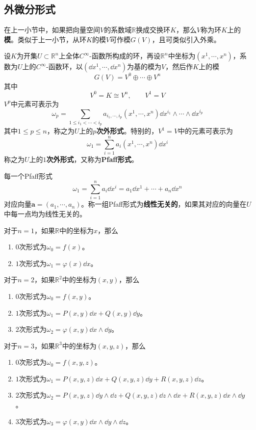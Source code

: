 \documentclass[lang = cn, scheme = chinese, thmcnt = section]{elegantbook}
\newcommand{\R}{\mathbb{R}}            %
\newcommand{\sub}{\subset}             %
\newcommand{\bs}{\boldsymbol}          %
\begin{document}
\subsection{外微分形式}

在上一小节中，如果把向量空间$V$的系数域$\R$换成交换环$K$，那么$V$称为环$K$上的\textbf{模}。类似于上一小节，从环$K$的模$V$可作模$G(V)$，且可类似引入外乘。

设$K$为开集$U\sub\R^n$上全体$C^\infty$-函数所构成的环，再设$\R^n$中坐标为$(x^1,\cdots,x^n)$，系数为$U$上的$C^\infty$-函数环，以$(\dd x^1,\cdots,\dd x^n)$为基的模为$V$，然后作$K$上的模%
$$
G(V)=V^0\oplus\cdots\oplus V^n
$$
其中%
$$
V^0=K\cong V^n,\qquad V^1=V
$$
$V^p$中元素可表示为%
$$
\omega_p=\sum_{1\le i_1<\cdots<i_p}a_{i_1,\cdots,i_p}(x^1,\cdots,x^n)\dd x^{i_1}\wedge\cdots\wedge\dd x^{i_p}
$$
其中$1\le p \le n$，称之为$U$上的\textbf{$p$次外形式}。特别的，$V^1=V$中的元素可表示为%
$$
\omega_1=\sum_{i=1}^{n}a_i(x^1,\cdots,x^n)\dd x^{i}
$$
称之为$U$上的\textbf{$1$次外形式}，又称为\textbf{Pfaff形式}。

每一个Pfaff形式
$$
\omega_1=\sum_{i=1}^{n}a_i\dd x^{i}
=a_1\dd x^{1}+\cdots+a_n\dd x^{n}
$$
对应向量$\bs{a}=(a_1,\cdots,a_n)$。称一组Pfaff形式为\textbf{线性无关的}，如果其对应的向量在$U$中每一点均为线性无关的。

\begin{example}
	对于$n=1$，如果$\R$中的坐标为$x$，那么
	\begin{enumerate}
		\item $0$次形式为$\omega_0=f(x)$。
		\item $1$次形式为$\omega_1=\varphi(x)\dd x$。
	\end{enumerate}
\end{example}

\begin{example}
	对于$n=2$，如果$\R^2$中的坐标为$(x,y)$，那么
	\begin{enumerate}
		\item $0$次形式为$\omega_0=f(x,y)$。
		\item $1$次形式为$\omega_1=P(x,y)\dd x+Q(x,y)\dd y$。
		\item $2$次形式为$\omega_2=\varphi(x,y)\dd x\wedge\dd y$。
	\end{enumerate}
\end{example}

\begin{example}
	对于$n=3$，如果$\R^3$中的坐标为$(x,y,z)$，那么
	\begin{enumerate}
		\item $0$次形式为$\omega_0=f(x,y,z)$。
		\item $1$次形式为$\omega_1=P(x,y,z)\dd x+Q(x,y,z)\dd y+R(x,y,z)\dd z$。
		\item $2$次形式为$\omega_2=P(x,y,z)\dd y\wedge \dd z+Q(x,y,z)\dd z\wedge \dd x+R(x,y,z)\dd x\wedge \dd y$。
		\item $3$次形式为$\omega_3=\varphi(x,y)\dd x\wedge\dd y\wedge \dd z$。
	\end{enumerate}
\end{example}
\end{document}
